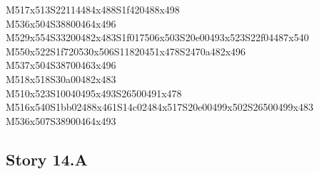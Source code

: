 \documentclass{article}
\begin{document}
\begin{multicols}{5}
\begin{center}
M517x513S22114484x488S1f420488x498 %
\\M536x504S38800464x496 %
\\M529x554S33200482x483S1f017506x503S20e00493x523S22f04487x540 %
\\M550x522S1f720530x506S11820451x478S2470a482x496 %
\\M537x504S38700463x496 %
\\M518x518S30a00482x483 %
\\M510x523S10040495x493S26500491x478 %
\\M516x540S1bb02488x461S14c02484x517S20e00499x502S26500499x483 %
\\M536x507S38900464x493 %
\vfil

\end{center}
\end{multicols}

\subsection{Story 14.A}
\end{document}
